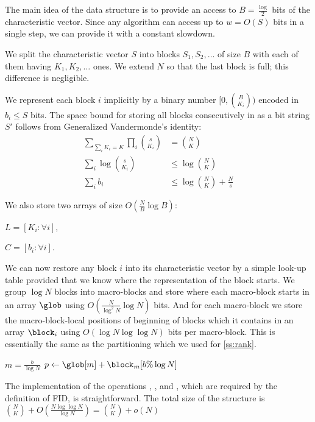 The main idea of the data structure is to provide an access to $B = \frac{\log}{2}$ bits of the characteristic vector.
Since any algorithm can access up to $w = O(S)$ bits in a single step, we can provide it with a constant slowdown.

We split the characteristic vector $S$ into blocks $S_1, S_2, \ldots$ of size $B$ with each of them having $K_1, K_2, \ldots$ ones.
We extend $N$ so that the last block is full; this difference is negligible.

We represent each block $i$ implicitly by a binary number $[0, {B \choose K_i})$ encoded in $b_i \le S$ bits.
The space bound for storing all blocks consecutively in as a bit string $S'$ follows from Generalized Vandermonde's identity:
\begin{align*}
	\sum_{\sum_i K_i = K} \prod_i {s \choose K_i} &= {N \choose K} \\
	\sum_i \log {s \choose K_i} &\le \log {N \choose K} \\
	\sum_i b_i &\le \log {N \choose K} + \frac{N}{s}
\end{align*}

We also store two arrays of size $O(\frac{N}{B} \log B)$:
\begin{iteminline}
	\item $L = [K_i : \forall i]$,
	\item $C = [b_i : \forall i]$.
\end{iteminline}

We can now restore any block $i$ into its characteristic vector by a simple look-up table provided that we know where the representation of the block starts.
We group $\log N$ blocks into macro-blocks and store where each macro-block starts in an array $\glob$ using $O(\frac{N}{\log^2 N} \log N)$ bits.
And for each macro-block we store the macro-block-local positions of beginning of blocks which it contains in an array $\block_i$ using $O(\log N \log \log N)$ bits per macro-block.
This is essentially the same as the partitioning which we used for \rank{} \ref{ss:rank}.

\begin{algorithmic}
 
	\State $m = \frac{b}{\log N}$
	\State $p \gets \glob[m] + \block_m[b \% \log N]$
	\State {}
\EndFunction
\end{algorithmic}

The implementation of the operations \rank{}, \select{}, and \inspect{}, which are required by the definition of FID, is straightforward.
The total size of the structure is ${N \choose K} + O(\frac{N \log \log N}{\log N}) = {N \choose K} + o(N)$

